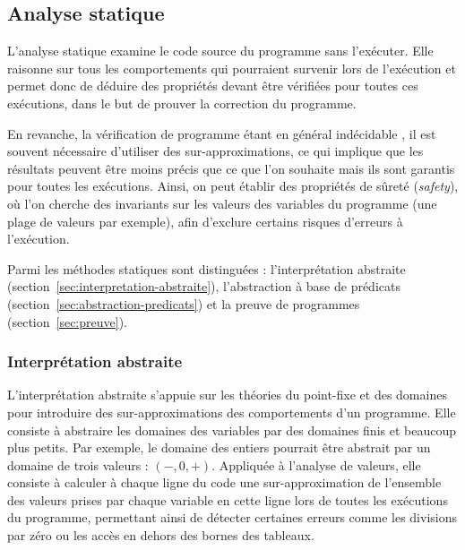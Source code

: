 

\subsection{Analyse statique}
\label{sec:AS}


L'analyse statique \cite{Nielson/99} examine le code source du programme
sans l'exécuter. Elle raisonne sur tous les comportements qui pourraient
survenir lors de l'exécution et permet donc de déduire des propriétés devant
être vérifiées pour toutes ces exécutions, dans le but de prouver la correction
du programme.

En revanche, la vérification de programme étant en général indécidable
\cite{Landi/92}, il est souvent nécessaire d'utiliser des
sur-approximations, ce qui implique que les résultats peuvent être moins précis
que ce que l'on souhaite mais ils sont garantis pour toutes les exécutions.
Ainsi, on peut établir des propriétés de sûreté ({\em safety}), où l’on cherche
des invariants sur les valeurs des variables du programme (une plage de valeurs
par exemple), afin d'exclure certains risques d'erreurs à l'exécution.

Parmi les méthodes statiques sont distinguées : l'interprétation abstraite
(section~\ref{sec:interpretation-abstraite}), l'abstraction à base de
prédicats (section~\ref{sec:abstraction-predicats}) et la preuve de programmes
(section~\ref{sec:preuve}).


\subsubsection*{Interprétation abstraite}
\label{sec:interpretation-abstraite}


L'interprétation abstraite \cite{Cousot/92} s'appuie sur les
théories du point-fixe et des domaines pour introduire des sur-approximations
des comportements d'un programme. Elle consiste à abstraire les domaines des
variables par des domaines finis et beaucoup plus petits. Par exemple, le
domaine des entiers pourrait être abstrait par un domaine de trois valeurs :
$(-, 0, +)$. Appliquée à l’analyse de valeurs, elle consiste à calculer à
chaque ligne du code une sur-approximation de l’ensemble des valeurs prises par
chaque variable en cette ligne lors de toutes les exécutions du programme,
permettant ainsi de détecter certaines erreurs comme les divisions par zéro ou
les accès en dehors des bornes des tableaux.

